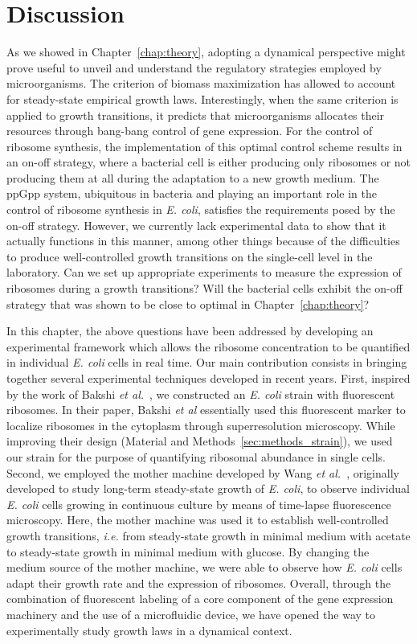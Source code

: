 \section{Discussion}
\label{sec:chap3_discussion}

As we showed in Chapter~\ref{chap:theory}, adopting a dynamical perspective might prove useful to unveil and understand the regulatory strategies employed by microorganisms.
The criterion of biomass maximization has allowed to account for steady-state empirical growth laws.
Interestingly, when the same criterion is applied to growth transitions, it predicts that microorganisms allocates their resources through bang-bang control of gene expression.
For the control of ribosome synthesis, the implementation of this optimal control scheme results in an on-off strategy, where a bacterial cell is either producing only ribosomes or not producing them at all during the adaptation to a new growth medium.
The ppGpp system, ubiquitous in bacteria and playing an important role in the control of ribosome synthesis in \textit{E. coli}, satisfies the requirements posed by the on-off strategy.
However, we currently lack experimental data to show that it actually functions in this manner, among other things because of the difficulties to produce well-controlled growth transitions on the single-cell level in the laboratory.
Can we set up appropriate experiments to measure the expression of ribosomes during a growth transitions?
Will the bacterial cells exhibit the on-off strategy that was shown to be close to optimal in Chapter~\ref{chap:theory}?

In this chapter, the above questions have been addressed by developing an experimental framework which allows the ribosome concentration to be quantified in individual \textit{E. coli} cells in real time.
Our main contribution consists in bringing together several experimental techniques developed in recent years.
First, inspired by the work of Bakshi \textit{et al.}~\cite{bakshi_superresolution_2012}, we constructed an \textit{E. coli} strain with fluorescent ribosomes.
In their paper, Bakshi \textit{et al} essentially used this fluorescent marker to localize ribosomes in the cytoplasm through superresolution microscopy.
While improving their design (Material and Methods~\ref{sec:methods_strain}), we used our strain for the purpose of quantifying ribosomal abundance in single cells.
Second, we employed the mother machine developed by Wang \textit{et al.}~\cite{wang_robust_2010}, originally developed to study long-term steady-state growth of \textit{E. coli}, to observe individual \textit{E. coli} cells growing in continuous culture by means of time-lapse fluorescence microscopy.
Here, the mother machine was used it to establish well-controlled growth transitions, \textit{i.e.} from steady-state growth in minimal medium with acetate to steady-state growth in minimal medium with glucose.
By changing the medium source of the mother machine, we were able to observe how \textit{E. coli} cells adapt their growth rate and the expression of ribosomes.
Overall, through the combination of fluorescent labeling of a core component of the gene expression machinery and the use of a microfluidic device, we have opened the way to experimentally study growth laws in a dynamical context.


